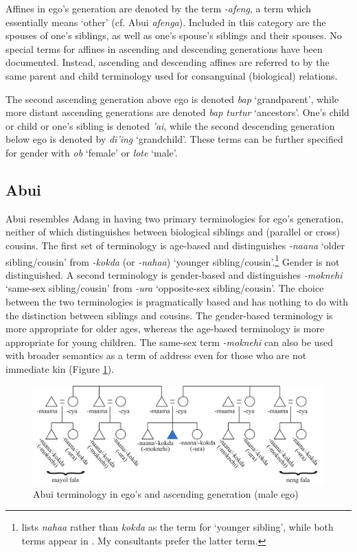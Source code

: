 Affines in ego's generation are denoted by the term \textit{{}-afeng}, a term which essentially means `other' (cf. Abui \textit{afenga}). Included in this category are the spouses of one's siblings, as well as one's spouse's siblings and their spouses. No special terms for affines in ascending and descending generations have been documented. Instead, ascending and descending affines are referred to by the same parent and child terminology used for consanguinal (biological) relations. 

The second ascending generation above ego is denoted \textit{bap} `grandparent', while more distant ascending generations are denoted \textit{bap turtur} `ancestors'. One's child or child or one's sibling is denoted \textit{'ai}, while the second descending generation below ego is denoted by \textit{di'ing} `grandchild'. These terms can be further specified for gender with \textit{ob} `female' or \textit{lote} `male'. 

 
\subsection{Abui}\label{sect_abui}
Abui resembles Adang in having two primary terminologies for ego's generation, neither of which distinguishes between biological siblings and (parallel or cross) cousins. The first set of terminology is age-based and distinguishes \textit{-naana} `older sibling/cousin' from \textit{-kokda} (or \textit{-nahaa}) `younger sibling/cousin'.\footnote{\citet[56]{Nicolspeyer1940} lists \textit{nahaa} rather than \textit{kokda} as the term for `younger sibling', while both terms appear in \citet{KratochvilEtAl2008kamus}. My consultants prefer the latter term.}  Gender is not distinguished. A second terminology is gender-based and distinguishes \textit{-moknehi} `same-sex sibling/cousin' from \textit{-ura} `opposite-sex sibling/cousin'. The choice between the two terminologies is pragmatically based and has nothing to do with the distinction between siblings and cousins. The gender-based terminology is more appropriate for older ages, whereas the age-based terminology is more appropriate for young children. The same-sex term \textit{-moknehi} can also be used with broader semantics as a term of address even for those who are not immediate kin (Figure \ref{fig:5:10}).

\begin{figure}[h]
\includegraphics[width=\textwidth]{figures/Holton_ch5_fig10.pdf}
\caption{Abui terminology in ego's and ascending generation (male ego)}
\label{fig:5:10}
\end{figure}  

